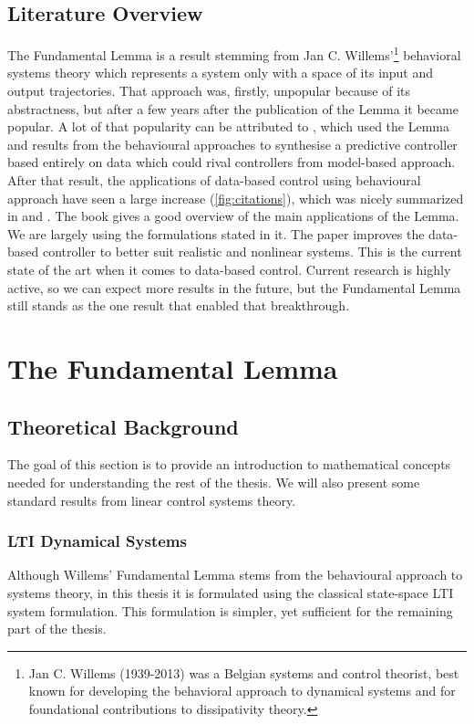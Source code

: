 \documentclass[12pt,a4paper]{report}
\begin{document}
\section{Literature Overview}
The Fundamental Lemma is a result stemming from Jan C. Willems'\footnote{Jan C. Willems (1939-2013) was a Belgian systems and control theorist, best known for developing the behavioral approach to dynamical systems and for foundational contributions to dissipativity theory.}
behavioral systems theory \cite{polderman1998mathematicalsystems} which represents a system only with a space of its input and output trajectories. That approach was, firstly, unpopular because of its abstractness, but after a few
years after the publication of the Lemma \cite{willems2005note} it became popular. A lot of that popularity can be attributed to \cite{coulson2019data}, which used the Lemma and results from the behavioural approaches
to synthesise a predictive controller based entirely on data which could rival controllers from model-based approach. After that result, the applications of data-based control using behavioural approach have seen
a large increase (\ref{fig:citations}), which was nicely summarized in \cite{dorfler2023datadrivencontrol} and \cite{verheijen2023handbook}. The book \cite{dbcbook} gives a good overview of the main applications of the
Lemma. We are largely using the formulations stated in it. The paper \cite{huang2024robustkernelizeddeepc} improves the data-based controller to better suit realistic and nonlinear
systems. This is the current state of the art when it comes to data-based control. Current research is highly active, so we can expect more results in the future, but the Fundamental Lemma still stands as the
one result that enabled that breakthrough.


\chapter{The Fundamental Lemma}

\section{Theoretical Background}
The goal of this section is to provide an introduction to mathematical concepts needed for understanding
the rest of the thesis. We will also present some standard results from linear control systems theory.
\subsection{LTI Dynamical Systems}
Although Willems' Fundamental Lemma stems from the behavioural approach to systems theory, in this thesis it is formulated using the
classical state-space LTI system formulation. This formulation is simpler, yet sufficient for the remaining part of the thesis.
\end{document}
